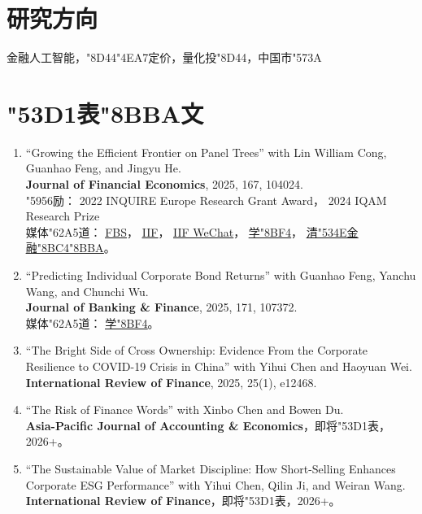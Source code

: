 \documentclass{clean_cv}
\newcommand{\UTF}[1]{\char"#1}
\begin{document}
\section{研究方向}
\begin{center}
		金融人工智能，\UTF{8D44}\UTF{4EA7}定价，量化投\UTF{8D44}，中国市\UTF{573A}%
\end{center}

\section{\UTF{53D1}表\UTF{8BBA}文}

\begin{enumerate}
	\setlength\itemsep{1.0em}

	\item ``Growing the Efficient Frontier on Panel Trees''
		with Lin William Cong, Guanhao Feng, and Jingyu He. \\
		\textbf{Journal of Financial Economics}, 2025, 167, 104024.
		\\
		\UTF{5956}励：
			2022 INQUIRE Europe Research Grant Award，
			2024 IQAM Research Prize
			\\
		媒体\UTF{62A5}道：
			\href{https://mp.weixin.qq.com/s/ePnIBXRj2YE-RSQkoWZTNw}{\underline{FBS}}，
			\href{https://iif.ustc.edu.cn/2025/0220/c19557a674300/page.htm}{\underline{IIF}}，
			\href{https://mp.weixin.qq.com/s/rUE0shWHWTzA0EEig2ImCA}{\underline{IIF WeChat}}，
			\href{https://mp.weixin.qq.com/s/_hwltnHmtVf8iTVh62LhBQ}{\underline{学\UTF{8BF4}}}，
			\href{http://thfr.com.cn/magazine_detail.php?id=149}{\underline{清\UTF{534E}金融\UTF{8BC4}\UTF{8BBA}}}。

	\item ``Predicting Individual Corporate Bond Returns''
		with Guanhao Feng, Yanchu Wang, and Chunchi Wu. \\
		\textbf{Journal of Banking \& Finance}, 2025, 171, 107372. \\
		媒体\UTF{62A5}道：
			\href{https://mp.weixin.qq.com/s/_hwltnHmtVf8iTVh62LhBQ}{\underline{学\UTF{8BF4}}}。

	\item ``The Bright Side of Cross Ownership: Evidence From the Corporate Resilience to COVID-19 Crisis in China''
		with Yihui Chen and Haoyuan Wei. \\
		\textbf{International Review of Finance}, 2025, 25(1), e12468.

	\item ``The Risk of Finance Words''
		with Xinbo Chen and Bowen Du. \\
		\textbf{Asia-Pacific Journal of Accounting \& Economics}，即将\UTF{53D1}表，2026+。

	\item ``The Sustainable Value of Market Discipline: How Short-Selling Enhances Corporate ESG Performance''
		with Yihui Chen, Qilin Ji, and Weiran Wang. \\
		\textbf{International Review of Finance}，即将\UTF{53D1}表，2026+。

\end{enumerate}
\end{document}
